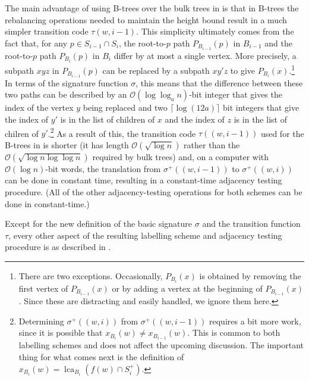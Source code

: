 \documentclass{patmorin}
\DeclareMathOperator{\lca}{lca}
\newcommand{\Oh}{\mathcal{O}}
\begin{document}
  The main advantage of using B-trees over the bulk trees in \cite{dujmovic.esperet.ea:adjacency} is that in B-trees the rebalancing operations needed to maintain the height bound result in a much simpler transition code $\tau(w,i-1)$.
  This simplicity ultimately comes from the fact that, for any $p\in S_{i-1}\cap S_i$, the root-to-$p$ path $P_{B_{i-1}}(p)$ in $B_{i-1}$ and the root-to-$p$ path $P_{B_i}(p)$ in $B_i$ differ by at most a single vertex.
  More precisely, a subpath $xyz$ in $P_{B_{i-1}}(p)$ can be replaced by a subpath $xy'z$ to give $P_{B_i}(x)$.\footnote{There are two exceptions.
  Occasionally, $P_{B_i}(x)$ is obtained by removing the first vertex of $P_{B_{i-1}}(x)$ or by adding a vertex at the beginning of $P_{B_{i-1}}(x)$.
  Since these are distracting and easily handled, we ignore them here.}  In terms of the signature function $\sigma$, this means that the difference between these two paths can be described by an $\Oh(\log\log_a n)$-bit integer that gives the index of the vertex $y$ being replaced and two $\lceil\log (12a)\rceil$ bit integers that give the index of $y'$ is in the list of children of $x$ and the index of $z$ is in the list of chilren of $y'$.\footnote{Determining $\sigma^+((w,i))$ from $\sigma^+((w,i-1))$ requires a bit more work, since it is possible that $x_{B_i}(w)\neq x_{B_{i-1}}(w)$.
  This is common to both labelling schemes and does not affect the upcoming discussion.
  The important thing for what comes next is the definition of $x_{B_i}(w)=\lca_{B_i}(f(w)\cap S^+_i)$.}  As a result of this, the transition code $\tau((w,i-1))$ used for the B-trees in \cite{gawrychowski.janczewski:simpler} is shorter (it has length $\Oh(\sqrt{\log n})$ rather than the $\Oh(\sqrt{\log n\log\log n})$ required by bulk trees) and, on a computer with $\Oh(\log n)$-bit words, the translation from $\sigma^+((w,i-1))$ to $\sigma^+((w,i))$ can be done in constant time, resulting in a constant-time adjacency testing procedure.
  (All of the other adjacency-testing operations for both schemes can be done in constant-time.)

  Except for the new definition of the basic signature $\sigma$ and the transition function $\tau$, every other aspect of the resulting labelling scheme and adjacency testing procedure is as described in \cite{dujmovic.esperet.ea:adjacency}.
\end{document}

